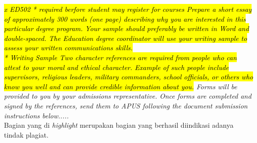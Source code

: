 \documentclass[../Proposal.tex]{subfiles}
\begin{document}
	\textit{\hl{x ED502 * required berfore student may register for courses Prepare a short essay of approximately 300 words (one page) describing why you are interested in this particular degree program. Your sample should preferably be written in Word and double-spaced. The Education degree coordinator will use your writing sample to assess your written communications skills.\\ * Writing Sample Two character references are required from people who can attest to your moral and ethical character. Example of such people include supervisors, religious leaders, military commanders, school officials, or others who know you well and can provide credible information about you.} Forms will be provided to you by your admissions representative. Once forms are completed and signed by the references, send them to APUS following the document submission instructions below.....} \\
	
	Bagian yang di \textit{highlight} merupakan bagian yang berhasil diindikasi adanya tindak plagiat.
\end{document}
